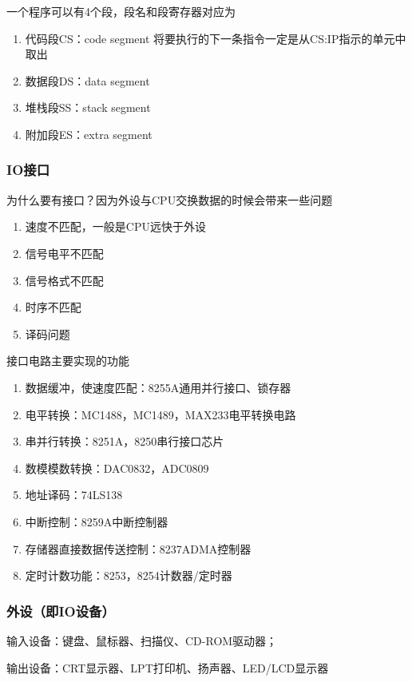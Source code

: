 一个程序可以有4个段，段名和段寄存器对应为
\begin{enumerate}\label{段寄存器4种}
    \item 代码段CS：code segment 将要执行的下一条指令一定是从CS:IP指示的单元中取出
    \item 数据段DS：data segment
    \item 堆栈段SS：stack segment
    \item 附加段ES：extra segment
\end{enumerate}
\subsubsection{IO接口}
为什么要有接口？因为外设与CPU交换数据的时候会带来一些问题
\begin{enumerate}
    \item 速度不匹配，一般是CPU远快于外设
    \item 信号电平不匹配
    \item 信号格式不匹配
    \item 时序不匹配
    \item 译码问题
\end{enumerate}
接口电路主要实现的功能
\begin{enumerate}
    \item 数据缓冲，使速度匹配：8255A通用并行接口、锁存器
    \item 电平转换：MC1488，MC1489，MAX233电平转换电路
    \item 串并行转换：8251A，8250串行接口芯片
    \item 数模模数转换：DAC0832，ADC0809
    \item 地址译码：74LS138
    \item 中断控制：8259A中断控制器
    \item 存储器直接数据传送控制：8237ADMA控制器
    \item 定时计数功能：8253，8254计数器/定时器
\end{enumerate}
\subsubsection{外设（即IO设备）}
输入设备：键盘、鼠标器、扫描仪、CD-ROM驱动器；

输出设备：CRT显示器、LPT打印机、扬声器、LED/LCD显示器
